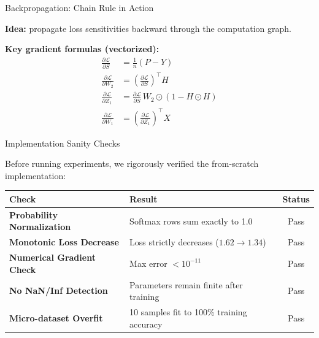\documentclass[11pt,aspectratio=169]{beamer}
\begin{document}
\begin{frame}{Backpropagation: Chain Rule in Action}

\textbf{Idea:} propagate loss sensitivities backward through the computation graph.

\vspace{0.3em}
\textbf{Key gradient formulas (vectorized):}
\begin{align*}
\frac{\partial \mathcal{L}}{\partial S} &= \tfrac{1}{n}(P - Y) \\[4pt]
\frac{\partial \mathcal{L}}{\partial W_2} &= \left(\tfrac{\partial \mathcal{L}}{\partial S}\right)^\top H \\[4pt]
\frac{\partial \mathcal{L}}{\partial Z_1} &= \tfrac{\partial \mathcal{L}}{\partial S}\, W_2 \odot (1 - H \odot H) \\[4pt]
\frac{\partial \mathcal{L}}{\partial W_1} &= \left(\tfrac{\partial \mathcal{L}}{\partial Z_1}\right)^\top X
\end{align*}

\end{frame}

\begin{frame}{Implementation Sanity Checks}

Before running experiments, we rigorously verified the from-scratch implementation:

\begin{table}[h]
    \centering
    \renewcommand{\arraystretch}{1.3} %
    \begin{tabular}{@{}llc@{}}
        \toprule
        \textbf{Check} & \textbf{Result} & \textbf{Status} \\
        \midrule
        \textbf{Probability Normalization} & Softmax rows sum exactly to 1.0 & \textcolor{accentgreen}{Pass} \\
        \textbf{Monotonic Loss Decrease} & Loss strictly decreases ($1.62 \rightarrow 1.34$) & \textcolor{accentgreen}{Pass} \\
        \textbf{Numerical Gradient Check} & Max error $< 10^{-11}$ & \textcolor{accentgreen}{Pass} \\
        \textbf{No NaN/Inf Detection} & Parameters remain finite after training & \textcolor{accentgreen}{Pass} \\
        \textbf{Micro-dataset Overfit} & 10 samples fit to 100\% training accuracy & \textcolor{accentgreen}{Pass} \\
        \bottomrule
    \end{tabular}
\end{table}

\end{frame}
\end{document}
